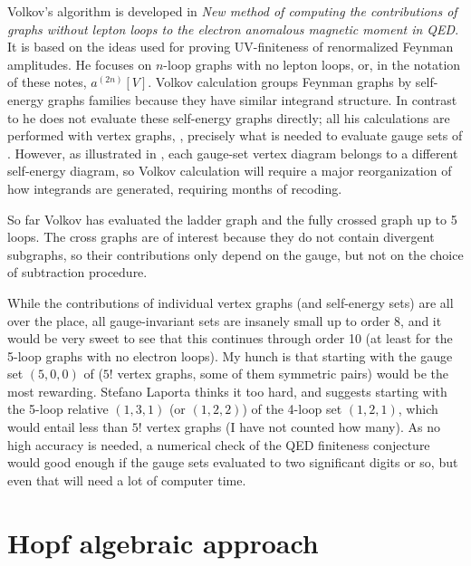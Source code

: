 Volkov's algorithm is developed in {\em New method of computing the
contributions of graphs without lepton loops to the electron anomalous
magnetic moment in {QED}}. It is based on the ideas used for
proving UV-finiteness of renormalized Feynman
amplitudes. He focuses on $n$-loop graphs with no
lepton loops, or, in the notation of these notes, $a^{(2n)}[V]$.
%
Volkov calculation groups Feynman graphs by self-energy graphs families
because they have similar integrand structure. In contrast to
 he does not evaluate
these self-energy graphs directly; all his calculations are performed
with vertex graphs, \ie, precisely what is needed to evaluate gauge sets
of . However, as illustrated in
, each gauge-set vertex diagram belongs to a
different self-energy diagram, so Volkov calculation will require a major
reorganization of how integrands are generated, requiring months
of recoding.

So far Volkov  has evaluated the ladder graph
and the fully crossed graph
up to 5 loops. The cross graphs are of interest because they do not
contain divergent subgraphs, so their contributions only depend on the
gauge, but not on the choice of subtraction procedure.

While the contributions of individual vertex graphs (and self-energy
sets) are all over the place, all gauge-invariant sets are
insanely small up to order 8, and it would be very sweet to see that this
continues through order 10 (at least for the 5-loop graphs with no
electron loops).
My hunch is that starting with the gauge set $(5,0,0)$ of
 ($5!$ vertex graphs, some of them symmetric pairs)
would be the most rewarding.
Stefano Laporta thinks it too hard, and suggests starting with the 5-loop
relative
$(1,3,1)$ (or $(1,2,2)$) of the 4-loop set $(1,2,1)$,
which would entail less than $5!$ vertex graphs (I have not counted
how many). As no high accuracy is needed, a numerical check of the QED
finiteness conjecture would good enough if the gauge sets evaluated
to two significant digits or so, but even that will need a lot of
computer time.

\section{Hopf algebraic approach}
\label{sect:HopfAlgebra}

